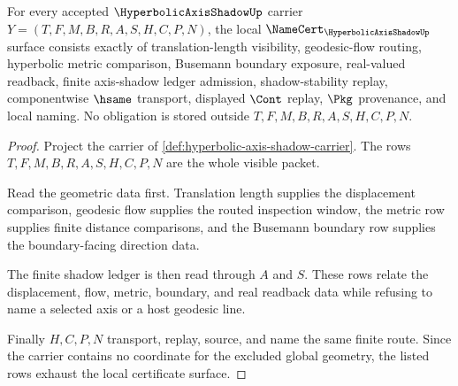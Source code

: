\begin{theorem}
\label{thm:hyperbolic-axis-shadow-obligations}
For every accepted $\HyperbolicAxisShadowUp$ carrier $Y=(T,F,M,B,R,A,S,H,C,P,N)$, the local $\NameCert_{\HyperbolicAxisShadowUp}$ surface consists exactly of translation-length visibility, geodesic-flow routing, hyperbolic metric comparison, Busemann boundary exposure, real-valued readback, finite axis-shadow ledger admission, shadow-stability replay, componentwise $\hsame$ transport, displayed $\Cont$ replay, $\Pkg$ provenance, and local naming. No obligation is stored outside $T,F,M,B,R,A,S,H,C,P,N$.
\end{theorem}
\begin{proof}
Project the carrier of \autoref{def:hyperbolic-axis-shadow-carrier}. The rows $T,F,M,B,R,A,S,H,C,P,N$ are the whole visible packet.

Read the geometric data first. Translation length supplies the displacement comparison, geodesic flow supplies the routed inspection window, the metric row supplies finite distance comparisons, and the Busemann boundary row supplies the boundary-facing direction data.

The finite shadow ledger is then read through $A$ and $S$. These rows relate the displacement, flow, metric, boundary, and real readback data while refusing to name a selected axis or a host geodesic line.

Finally $H,C,P,N$ transport, replay, source, and name the same finite route. Since the carrier contains no coordinate for the excluded global geometry, the listed rows exhaust the local certificate surface.
\end{proof}

